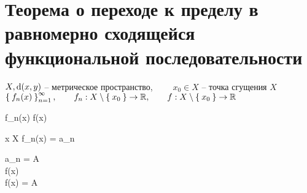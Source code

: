 \section{Теорема о переходе к пределу в равномерно сходящейся функциональной последовательности}

\begin{theorem}
	$ X, \operatorname{d}(x, y) $ -- метрическое пространство, $ \qquad x_0 \in X $ -- точка сгущения $ X $ \\
	$ \Set{f_n(x)}_{n=1}^{\infty}, \qquad f_n : X \setminus \Set{x_0} \to \mathbb{R}, \qquad f : X \setminus \Set{x_0} \to \mathbb{R} $
	\begin{equ}{41}
		f_n(x)  f(x)
	\end{equ}
	\begin{equ}{42}
		\forall x \in X \setminus {} \quad \exist {} f_n(x) = a_n
	\end{equ}
	\begin{mequ}[\implies \empheqlbrace]
		 \exist {} a_n = A \in \R \\
		 \exist {} f(x) \\
		  f(x) = A
	\end{mequ}
\end{theorem}

